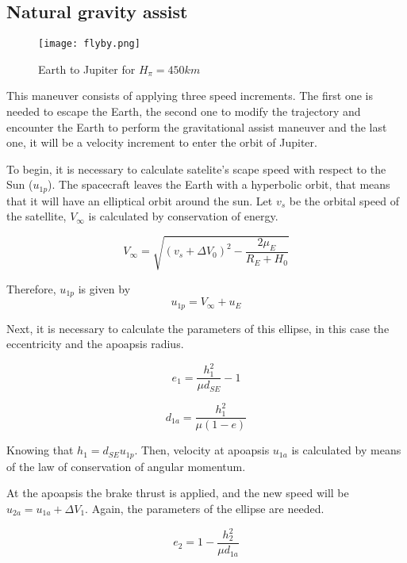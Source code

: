 \subsection{Natural gravity assist} 
\begin{figure}[H]
	\centering
		\texttt{[image: flyby.png]}
	\caption{Earth to Jupiter for $H_\pi = 450km$}
	\label{fig:flybytrim}
\end{figure}

This maneuver consists of applying three speed increments. The first one is needed to escape the Earth, the second one to modify the trajectory and encounter the Earth to perform the gravitational assist maneuver and the last one, it will be a velocity increment to enter the orbit of Jupiter.

To begin, it is necessary to calculate satelite's scape speed with respect to the Sun ($u_{1p}$).
The spacecraft leaves the Earth with a hyperbolic orbit, that means that it will have an elliptical orbit around the sun. Let $v_s$ be the orbital speed of the satellite, $V_\infty$ is calculated by conservation of energy.

\begin{equation*}
V_\infty = \sqrt{(v_s + \Delta V_0)^2 - \frac{2 \mu_E}{R_E + H_0}}
\end{equation*}

Therefore, $u_{1p}$ is given by
\begin{equation*}
u_{1p} = V_\infty + u_E
\end{equation*}

Next, it is necessary to calculate the parameters of this ellipse, in this case the eccentricity and the apoapsis radius.

\begin{equation*}
e_1 = \frac{h_1^2}{\mu d_{SE}} - 1 
\end{equation*}

\begin{equation*}
d_{1a} = \frac{h_1^2}{\mu (1 - e)}
\end{equation*}

Knowing that $h_1=d_{SE}u_{1p}$.
Then, velocity at apoapsis $u_{1a}$ is calculated by means of the law of conservation of angular momentum.

At the apoapsis the brake thrust is applied, and the new speed will be $u_{2a} = u_{1a} + \Delta V_1$. Again, the parameters of the ellipse are needed.

\begin{equation*}
e_2 = 1 - \frac{h_2^2}{\mu d_{1a}}  
\end{equation*}


